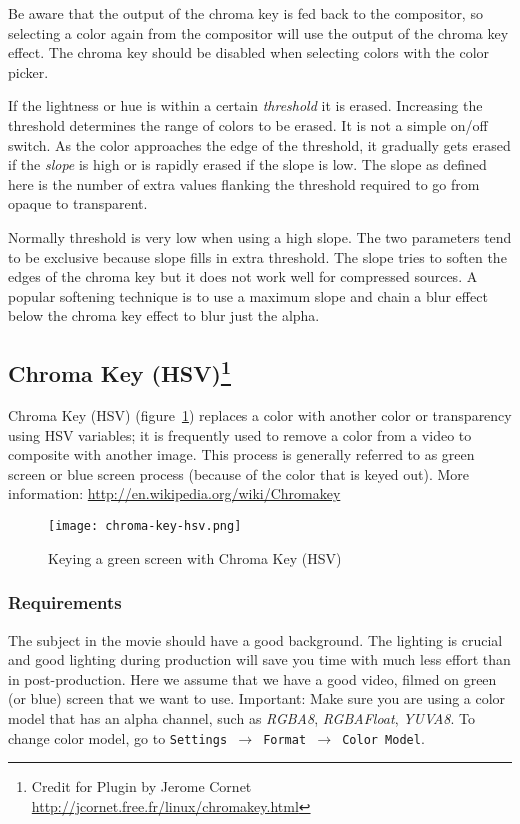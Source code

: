 Be aware that the output of the chroma key is fed back to the compositor, so selecting a color again from the compositor will use the output of the chroma key effect. The chroma key should be disabled when selecting colors with the color picker.

If the lightness or hue is within a certain \textit{threshold} it is erased. Increasing the threshold determines the range of colors to be erased. It is not a simple on/off switch. As the color approaches the edge of the threshold, it gradually gets erased if the \textit{slope} is high or is rapidly erased if the slope is low. The slope as defined here is the number of extra values flanking the threshold required to go from opaque to transparent.

Normally threshold is very low when using a high slope. The two parameters tend to be exclusive because slope fills in extra threshold. The slope tries to soften the edges of the chroma key but it does not work well for compressed sources. A popular softening technique is to use a maximum slope and chain a blur effect below the chroma key effect to blur just the alpha.

\subsection[Chroma Key (HSV)]{Chroma Key (HSV)\protect\footnote{Credit for Plugin by Jerome Cornet \url{http://jcornet.free.fr/linux/chromakey.html}}}%
\label{sub:chroma_key_hsv}

Chroma Key (HSV) (figure~\ref{fig:chroma-key-hsv}) replaces a color with another color or transparency using HSV variables; it is frequently used to remove a color from a video to composite with another image. This process is generally referred to as green screen or blue screen process (because of the color that is keyed out). More information: {\small \url{http://en.wikipedia.org/wiki/Chromakey}}

\begin{figure}[htpb]
    \centering
    \texttt{[image: chroma-key-hsv.png]}
    \caption{Keying a green screen with Chroma Key (HSV)}
    \label{fig:chroma-key-hsv}
\end{figure}

\subsubsection*{Requirements}
\label{ssub:requirements}

The subject in the movie should have a good background. The lighting is crucial and good lighting during production will save you time with much less effort than in post-production.
Here we assume that we have a good video, filmed on green (or blue) screen that we want to use. Important: Make sure you are using a color model that has an alpha channel, such as \textit{RGBA8}, \textit{RGBAFloat}, \textit{YUVA8}. To change color model, go to \texttt{Settings $\rightarrow$ Format $\rightarrow$ Color Model}.

